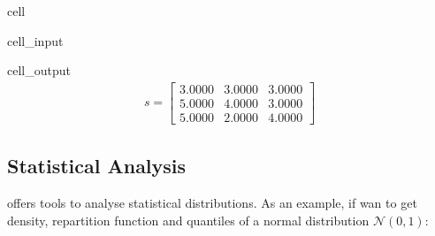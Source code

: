 \documentclass[letterpaper,10pt,english]{jupyterBook}
\begin{document}
\begin{sphinxuseclass}{cell}\begin{sphinxVerbatimInput}

\begin{sphinxuseclass}{cell_input}
\begin{sphinxVerbatim}[commandchars=\\\{\}]
  \PYG{p}{[}    \PYG{p}{]}
     
 
\end{sphinxVerbatim}

\end{sphinxuseclass}\end{sphinxVerbatimInput}
\begin{sphinxVerbatimOutput}

\begin{sphinxuseclass}{cell_output}\begin{equation*}
\begin{split}\displaystyle s=\left[
\begin{array}{}
  3.0000 &  3.0000 &  3.0000\\
  5.0000 &  4.0000 &  3.0000\\
  5.0000 &  2.0000 &  4.0000
\end{array}
\right]\end{split}
\end{equation*}
\end{sphinxuseclass}\end{sphinxVerbatimOutput}

\end{sphinxuseclass}

\subsection{Statistical Analysis}
\label{\detokenize{01:statistical-analysis}}
\sphinxAtStartPar
{} offers tools to analyse statistical distributions. As an example, if wan to get density, repartition function and quantiles of a normal distribution \(\mathcal{N}(0, 1)\):
\end{document}
